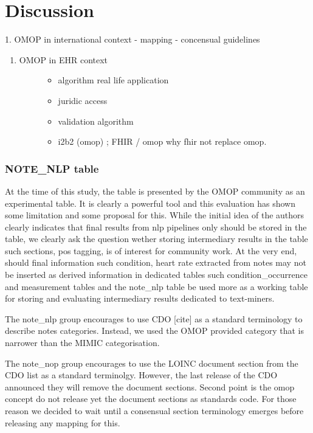 \section{Discussion}\label{discussion}

1. OMOP in international context - mapping - concensual guidelines

\begin{enumerate}
\def\labelenumi{\arabic{enumi}.}
\setcounter{enumi}{1}
\item
  \begin{description}
  \item[OMOP in EHR context]
  \begin{itemize}
  \tightlist
  \item
    algorithm real life application
  \item
    juridic access
  \item
    validation algorithm
  \item
    i2b2 (omop) ; FHIR / omop why fhir not replace omop.
  \end{itemize}
  \end{description}
\end{enumerate}

\subsubsection{NOTE\_NLP table}\label{noteux5fnlp-table}

At the time of this study, the table is presented by the OMOP community
as an experimental table. It is clearly a powerful tool and this
evaluation has shown some limitation and some proposal for this. While
the initial idea of the authors clearly indicates that final results
from nlp pipelines only should be stored in the table, we clearly ask
the question wether storing intermediary results in the table such
sections, pos tagging, is of interest for community work. At the very
end, should final information such condition, heart rate extracted from
notes may not be inserted as derived information in dedicated tables
such condition\_occurrence and measurement tables and the note\_nlp
table be used more as a working table for storing and evaluating
intermediary results dedicated to text-miners.

The note\_nlp group encourages to use CDO {[}cite{]} as a standard
terminology to describe notes categories. Instead, we used the OMOP
provided category that is narrower than the MIMIC categorisation.

The note\_nop group encourages to use the LOINC document section from
the CDO list as a standard terminolgy. However, the last release of the
CDO announced they will remove the document sections. Second point is
the omop concept do not release yet the document sections as standards
code. For those reason we decided to wait until a consensual section
terminology emerges before releasing any mapping for this.


